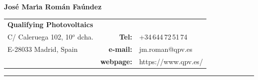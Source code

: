\documentclass{article}
\begin{document}

{\huge \bf  Jos\'e Mar\'{\i}a Rom\'an Fa\'undez}

\bigskip \medskip

\begin{tabular}{lrl}
{\bf Qualifying Photovoltaics} & & {\medskip} \\
{\small C/ Caleruega 102, 10$^o$ dcha.}
   & {\small {\bf Tel:}} & {\small +34\,644\,72\,51\,74} \\
{\small E-28033 Madrid, Spain}
   & {\small {\bf e-mail:}} & {\small jm.roman@qpv.es} \\
{\small}
   & {\small {\bf webpage:}} & {\small https://www.qpv.es/} \\

\end{tabular}

\bigskip

\hrule


\end{document}
